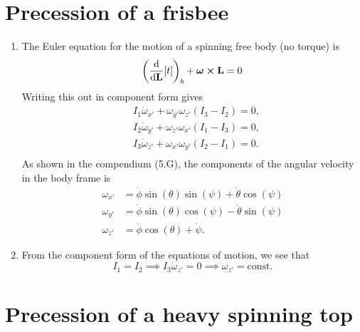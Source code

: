 \documentclass{article}
\begin{document}
    \section{Precession of a frisbee}

    \begin{enumerate}[label=(\alph*)]
    \item The Euler equation for the motion of a spinning free body (no torque) is 
        \begin{equation*}
            \left(\dv{\mathbf{L}}[t]\right)_b + \boldsymbol \omega \cross \mathbf{L} = 0
        \end{equation*}
        Writing this out in component form gives
        \begin{align*}
            & I_1 \dot \omega_{x'} + \omega_{y'}\omega_{z'}(I_3 - I_2) = 0, \\
            & I_2 \dot \omega_{y'} + \omega_{z'}\omega_{x'}(I_1 - I_3) = 0, \\
            & I_3 \dot \omega_{z'} + \omega_{x'}\omega_{y'}(I_2 - I_1) = 0 .\\
        \end{align*}
        As shown in the compendium (5.G), the components of the angular velocity in the body frame is 
        \begin{align*}
            \omega_{x'} & = \dot \phi \sin(\theta) \sin(\psi) + \dot\theta \cos(\psi) \\
            \omega_{y'} & = \dot \phi \sin(\theta)\cos(\psi) - \dot \theta  \sin(\psi)\\
            \omega_{z'} & = \dot \phi \cos(\theta) + \dot \psi.
        \end{align*}

    \item From the component form of the equations of motion, we see that 
        \begin{equation*}
            I_1 = I_2 \implies I_3 \dot \omega_{z'} = 0 \implies \omega_{z'} = \mathrm{const.}
        \end{equation*}

    \end{enumerate}

    \section{Precession of a heavy spinning top}
\end{document}
